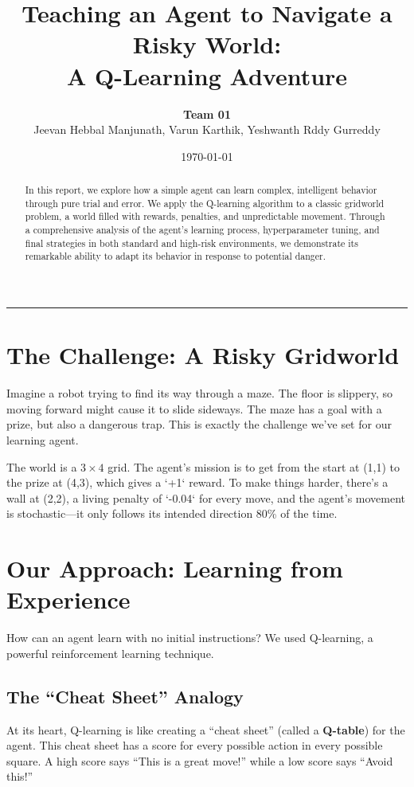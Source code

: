 \documentclass[11pt, a4paper]{article}
\title{\textbf{Teaching an Agent to Navigate a Risky World: \\ A Q-Learning Adventure}}
\author{\Large\textbf{Team 01}  \\Jeevan Hebbal Manjunath, Varun Karthik, Yeshwanth Rddy Gurreddy}
\date{\today}
\begin{document}
\maketitle

\begin{abstract}
In this report, we explore how a simple agent can learn complex, intelligent behavior through pure trial and error. We apply the Q-learning algorithm to a classic gridworld problem, a world filled with rewards, penalties, and unpredictable movement. Through a comprehensive analysis of the agent's learning process, hyperparameter tuning, and final strategies in both standard and high-risk environments, we demonstrate its remarkable ability to adapt its behavior in response to potential danger.
\end{abstract}

\hrule
\vspace{1em}

\section{The Challenge: A Risky Gridworld}
Imagine a robot trying to find its way through a maze. The floor is slippery, so moving forward might cause it to slide sideways. The maze has a goal with a prize, but also a dangerous trap. This is exactly the challenge we've set for our learning agent.

The world is a $3 \times 4$ grid. The agent's mission is to get from the start at (1,1) to the prize at (4,3), which gives a `+1` reward. To make things harder, there's a wall at (2,2), a living penalty of `-0.04` for every move, and the agent's movement is stochastic—it only follows its intended direction 80\% of the time.

\section{Our Approach: Learning from Experience}
How can an agent learn with no initial instructions? We used Q-learning, a powerful reinforcement learning technique.

\subsection{The ``Cheat Sheet'' Analogy}
At its heart, Q-learning is like creating a ``cheat sheet'' (called a \textbf{Q-table}) for the agent. This cheat sheet has a score for every possible action in every possible square. A high score says ``This is a great move!'' while a low score says ``Avoid this!''
\end{document}
